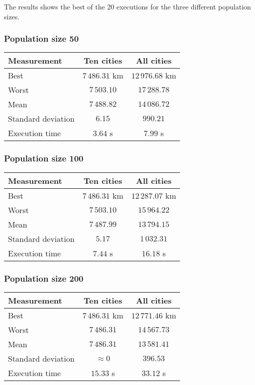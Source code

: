 \documentclass{article}
\begin{document}
The results shows the best of the 20 executions for the three different population sizes.

\subsubsection*{Population size 50}

\begin{center}
\begin{tabular}{lcc}
\toprule
Measurement & Ten cities & All cities \\
\midrule
Best & $7\,486.31$ km & $12\,976.68$ km \\
Worst & $7\,503.10$ & $17\,288.78$ \\
Mean & $7\,488.82$ & $14\,086.72$ \\
Standard deviation & $6.15$ & $990.21$ \\
Execution time & $3.64$ s & $7.99$ s \\
\bottomrule
\end{tabular}
\end{center}

\subsubsection*{Population size 100}

\begin{center}
\begin{tabular}{lcc}
\toprule
Measurement & Ten cities & All cities \\
\midrule
Best & $7\,486.31$ km & $12\,287.07$ km \\
Worst & $7\,503.10$ & $15\,964.22$ \\
Mean & $7\,487.99$ & $13\,794.15$ \\
Standard deviation & $5.17$ & $1\,032.31$ \\
Execution time & $7.44$ s & $16.18$ s \\
\bottomrule
\end{tabular}
\end{center}

\subsubsection*{Population size 200}

\begin{center}
\begin{tabular}{lcc}
\toprule
Measurement & Ten cities & All cities \\
\midrule
Best & $7\,486.31$ km & $12\,771.46$ km \\
Worst & $7\,486.31$ & $14\,567.73$ \\
Mean & $7\,486.31$ & $13\,581.41$ \\
Standard deviation & $\approx 0$ & $396.53$ \\
Execution time & $15.33$ s & $33.12$ s \\
\bottomrule
\end{tabular}
\end{center}
\end{document}
